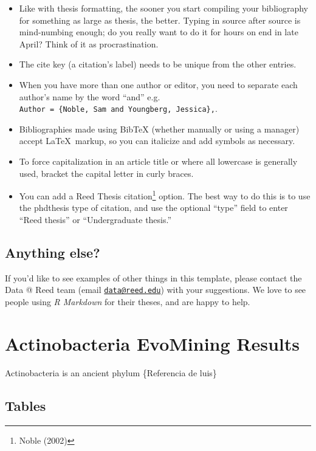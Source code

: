 \documentclass[12pt,twoside]{reedthesis}
\providecommand{\tightlist}{%
  \setlength{\itemsep}{0pt}\setlength{\parskip}{0pt}}
\begin{document}
  \begin{itemize}
  \tightlist
  \item
    Like with thesis formatting, the sooner you start compiling your
    bibliography for something as large as thesis, the better. Typing in
    source after source is mind-numbing enough; do you really want to do
    it for hours on end in late April? Think of it as procrastination.
  \item
    The cite key (a citation's label) needs to be unique from the other
    entries.
  \item
    When you have more than one author or editor, you need to separate
    each author's name by the word ``and'' e.g.
    \texttt{Author\ =\ \{Noble,\ Sam\ and\ Youngberg,\ Jessica\},}.
  \item
    Bibliographies made using BibTeX (whether manually or using a manager)
    accept \LaTeX~markup, so you can italicize and add symbols as
    necessary.
  \item
    To force capitalization in an article title or where all lowercase is
    generally used, bracket the capital letter in curly braces.
  \item
    You can add a Reed Thesis citation\footnote{Noble (2002)} option. The
    best way to do this is to use the phdthesis type of citation, and use
    the optional ``type'' field to enter ``Reed thesis'' or
    ``Undergraduate thesis.''
  \end{itemize}
  
  \section{Anything else?}\label{anything-else}
  
  If you'd like to see examples of other things in this template, please
  contact the Data @ Reed team (email
  \href{mailto:data@reed.edu}{\nolinkurl{data@reed.edu}}) with your
  suggestions. We love to see people using \emph{R Markdown} for their
  theses, and are happy to help.
  
  \hypertarget{ref_labels}{\chapter{Actinobacteria EvoMining
  Results}\label{ref_labels}}
  
  Actinobacteria is an ancient phylum \{Referencia de luis\}
  
  \section{Tables}\label{tables-1}
  
\end{document}
